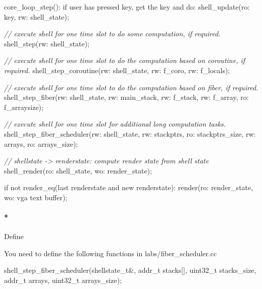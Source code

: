 \documentclass[]{article}
\newenvironment{Shaded}{}{}
\newcommand{\DataTypeTok}[1]{\textcolor[rgb]{0.50,0.00,0.00}{{#1}}}
\newcommand{\CommentTok}[1]{\textcolor[rgb]{0.50,0.50,0.50}{\textit{{#1}}}}
\newcommand{\ControlFlowTok}[1]{{#1}}
\newcommand{\NormalTok}[1]{{#1}}
\let\oldparagraph\paragraph
\renewcommand{\paragraph}[1]{\oldparagraph{#1}\mbox{}}
\begin{document}
\begin{Shaded}
\begin{Highlighting}[]
        \NormalTok{core_loop_step():}
            \ControlFlowTok{if} \NormalTok{user has pressed key, get the key and }\ControlFlowTok{do}\NormalTok{:}
                \NormalTok{shell_update(ro: key, rw: shell_state);}

            \CommentTok{// execute shell for one time slot to do some computation, if required.}
            \NormalTok{shell_step(rw: shell_state);}

            \CommentTok{// execute shell for one time slot to do the computation based on coroutine, if required.}
            \NormalTok{shell_step_coroutine(rw: shell_state, rw: f_coro, rw: f_locals);}

            \CommentTok{// execute shell for one time slot to do the computation based on fiber, if required.}
            \NormalTok{shell_step_fiber(rw: shell_state, rw: main_stack, rw: f_stack, rw: f_array, ro: f_arraysize);}

            \CommentTok{// execute shell for one time slot for additional long computation tasks.}
            \NormalTok{shell_step_fiber_scheduler(rw: shell_state, rw: stackptrs, ro: stackptrs_size, rw: arrays, ro: arrays_size);}

            \CommentTok{// shellstate -> renderstate: compute render state from shell state}
            \NormalTok{shell_render(ro: shell_state, wo: render_state);}

            \ControlFlowTok{if} \NormalTok{not render_eq(last renderstate and new renderstate):}
                \NormalTok{render(ro: render_state, wo: vga text buffer);}
\end{Highlighting}
\end{Shaded}

\paragraph*{Define}\label{define-6}

You need to define the following functions in labs/fiber\_scheduler.cc

\begin{Shaded}
\begin{Highlighting}[]
   \NormalTok{shell_step_fiber_scheduler(shellstate_t&, addr_t stacks[], }\DataTypeTok{uint32_t} \NormalTok{stacks_size, addr_t arrays, }\DataTypeTok{uint32_t} \NormalTok{arrays_size);}
\end{Highlighting}
\end{Shaded}
\end{document}
